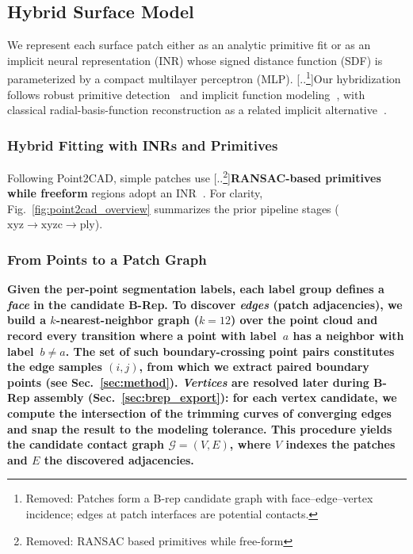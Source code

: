 \documentclass{ieeeaccess}
\providecommand{\DIFaddtex}[1]{{\color{blue}\bfseries #1}} %
\providecommand{\DIFdeltex}[1]{{\color{red}[..\footnote{\color{black}Removed: #1}]}} %
\providecommand{\DIFaddbegin}{} %
\providecommand{\DIFaddend}{} %
\providecommand{\DIFdelbegin}{} %
\providecommand{\DIFdelend}{} %
\providecommand{\DIFadd}[1]{\texorpdfstring{\DIFaddtex{#1}}{#1}} %
\providecommand{\DIFdel}[1]{\texorpdfstring{\DIFdeltex{#1}}{}} %
\begin{document}
\subsection{Hybrid Surface Model}
We represent each surface patch either as an analytic primitive fit
or as an implicit neural representation (INR) whose signed distance function (SDF)
is parameterized by a compact multilayer perceptron (MLP).
\DIFdelbegin \DIFdel{Patches form a B-rep candidate graph with face–edge–vertex incidence; edges at patch interfaces are potential contacts. }\DIFdelend Our hybridization follows robust primitive detection\DIFaddbegin \DIFadd{~}\DIFaddend \cite{b15} and implicit function modeling\DIFaddbegin \DIFadd{~}\DIFaddend \cite{b5,b6,b17,b21}, with classical radial-basis-function reconstruction as a related implicit alternative\DIFaddbegin \DIFadd{~}\DIFaddend \cite{b13}.

\subsubsection{Hybrid Fitting with INRs and Primitives}
Following Point2CAD, simple patches use \DIFdelbegin \DIFdel{RANSAC based primitives while free-form }\DIFdelend \DIFaddbegin \DIFadd{RANSAC-based primitives while freeform }\DIFaddend regions adopt an INR\DIFaddbegin \DIFadd{~}\DIFaddend \cite{b2,b15,b5,b17,b6,b21}. For clarity, Fig.~\ref{fig:point2cad_overview} summarizes the prior pipeline stages ($\text{xyz} \rightarrow \text{xyzc} \rightarrow \text{ply}$).

\DIFaddbegin \subsubsection{\DIFadd{From Points to a Patch Graph}}
\label{sec:patch_graph}
\DIFadd{Given the per-point segmentation labels, each label group defines a \emph{face} in the candidate B-Rep.
To discover \emph{edges} (patch adjacencies), we build a $k$-nearest-neighbor graph ($k{=}12$) over the point cloud and record every transition where a point with label~$a$ has a neighbor with label~$b{\neq}a$.
The set of such boundary-crossing point pairs constitutes the edge samples $(i,j)$, from which we extract paired boundary points (see Sec.~\ref{sec:method}).
\emph{Vertices} are resolved later during B-Rep assembly (Sec.~\ref{sec:brep_export}): for each vertex candidate, we compute the intersection of the trimming curves of converging edges and snap the result to the modeling tolerance.
This procedure yields the candidate contact graph $\mathcal{G}=(V,E)$, where $V$ indexes the patches and $E$ the discovered adjacencies.
}
\end{document}
